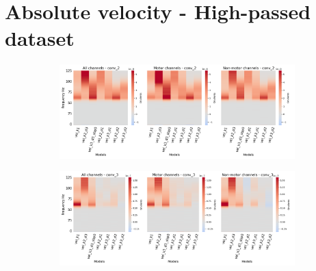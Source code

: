 \section*{Absolute velocity - High-passed dataset}\label{subsec:vel-high-passed-dataset-appendixD}
\begin{figure}[!htpb]
\centering
\begin{subfigure}[b]{\textwidth}
   \includegraphics[width=1\linewidth]{img/appendix/D/conv-2/hp-sm/vel_model_gradients_all_kinds}
   \caption{}
   \label{fig:vel-pw-hp-grads-conv-2}
\end{subfigure}

\begin{subfigure}[b]{\textwidth}
   \includegraphics[width=1\linewidth]{img/appendix/D/conv-3/hp-m/vel_model_gradients_all_kinds}
   \caption{}
   \label{fig:vel-pw-hp-grads-conv-3}
\end{subfigure}
\end{figure}
\clearpage   

